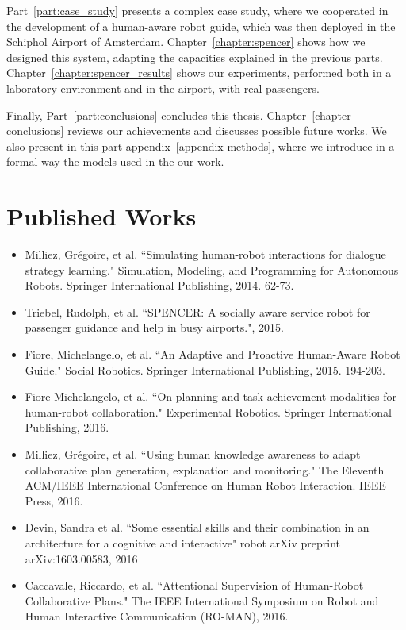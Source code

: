 Part~\ref{part:case_study} presents a complex case study, where we cooperated in the development of a human-aware robot guide, which was then deployed in the Schiphol Airport of Amsterdam. Chapter~\ref{chapter:spencer} shows how we designed this system, adapting the capacities explained in the previous parts. Chapter~\ref{chapter:spencer_results} shows our experiments, performed both in a laboratory environment and in the airport, with real passengers.

Finally, Part~\ref{part:conclusions} concludes this thesis. Chapter~\ref{chapter-conclusions} reviews our achievements and discusses possible future works. We also present in this part appendix~\ref{appendix-methods}, where we introduce in a formal way the models used in the our work.

\section{Published Works}
\begin{itemize}
\item Milliez, Grégoire, et al. ``Simulating human-robot interactions for dialogue strategy learning." Simulation, Modeling, and Programming for Autonomous Robots. Springer International Publishing, 2014. 62-73.
\item Triebel, Rudolph, et al. ``SPENCER: A socially aware service robot for passenger guidance and help in busy airports.", 2015.
\item Fiore, Michelangelo, et al. ``An Adaptive and Proactive Human-Aware Robot Guide." Social Robotics. Springer International Publishing, 2015. 194-203.
\item Fiore Michelangelo, et al. ``On planning and task achievement modalities for human-robot collaboration." Experimental Robotics. Springer International Publishing, 2016.
\item Milliez, Grégoire, et al. ``Using human knowledge awareness to adapt collaborative plan generation, explanation and monitoring." The Eleventh ACM/IEEE International Conference on Human Robot Interaction. IEEE Press, 2016.
\item Devin, Sandra et al. ``Some essential skills and their combination in an architecture for a cognitive and interactive" robot arXiv preprint arXiv:1603.00583, 2016
\item Caccavale, Riccardo, et al. ``Attentional Supervision of Human-Robot Collaborative Plans." The IEEE International Symposium on Robot and Human Interactive Communication (RO-MAN), 2016.
\end{itemize}


